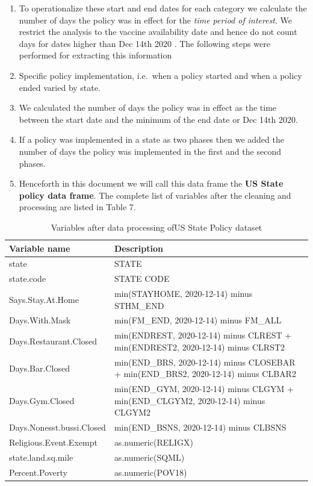 \documentclass[
]{article}
\providecommand{\tightlist}{%
  \setlength{\itemsep}{0pt}\setlength{\parskip}{0pt}}
\begin{document}
\begin{enumerate}
\def\labelenumi{\arabic{enumi}.}
\setcounter{enumi}{3}
\tightlist
\item
  To operationalize these start and end dates for each category we
  calculate the number of days the policy was in effect for the
  \emph{time period of interest}. We restrict the analysis to the
  vaccine availability date and hence do not count days for dates higher
  than Dec 14th 2020 . The following steps were performed for extracting
  this information
\item
  Specific policy implementation, i.e.~when a policy started and when a
  policy ended varied by state.
\item
  We calculated the number of days the policy was in effect as the time
  between the start date and the minimum of the end date or Dec 14th
  2020.
\item
  If a policy was implemented in a state as two phases then we added the
  number of days the policy was implemented in the first and the second
  phases.
\item
  Henceforth in this document we will call this data frame the
  \textbf{US State policy data frame}. The complete list of variables
  after the cleaning and processing are listed in Table 7.
\end{enumerate}

\begin{table}[!h]

\caption{\label{tab:state_policy_processed}Variables after data processing ofUS State Policy dataset}
\centering
\begin{tabular}[t]{l|>{\raggedright\arraybackslash}p{6cm}}
\hline
Variable name & Description\\
\hline
state & STATE\\
\hline
state.code & STATE CODE\\
\hline
Says.Stay.At.Home & min(STAYHOME, 2020-12-14) minus STHM\_END\\
\hline
Days.With.Mask & min(FM\_END, 2020-12-14) minus FM\_ALL\\
\hline
Days.Restaurant.Closed & min(ENDREST, 2020-12-14) minus CLREST + min(ENDREST2, 2020-12-14) minus CLRST2\\
\hline
Days.Bar.Closed & min(END\_BRS, 2020-12-14) minus CLOSEBAR + min(END\_BRS2, 2020-12-14) minus CLBAR2\\
\hline
Days.Gym.Closed & min(END\_GYM, 2020-12-14) minus CLGYM + min(END\_CLGYM2, 2020-12-14) minus CLGYM2\\
\hline
Days.Nonesst.bussi.Closed & min(END\_BSNS, 2020-12-14) minus CLBSNS\\
\hline
Religious.Event.Exempt & as.numeric(RELIGX)\\
\hline
state.land.sq.mile & as.numeric(SQML)\\
\hline
Percent.Poverty & as.numeric(POV18)\\
\hline
\end{tabular}
\end{table}
\end{document}
